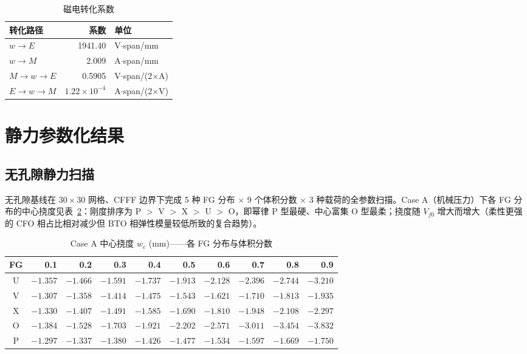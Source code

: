 \documentclass[11pt,a4paper]{ctexart}
\begin{document}
\begin{table}[H]
\centering
\caption{磁电转化系数}
\label{tab:coupling-coeff}
\begin{tabular}{lrl}
\toprule
\textbf{转化路径} & \textbf{系数} & \textbf{单位} \\
\midrule
$w \to E$ & 1941.40 & V$\cdot$span/mm \\
$w \to M$ & 2.009 & A$\cdot$span/mm \\
$M \to w \to E$ & 0.5905 & V$\cdot$span/(2$\times$A) \\
$E \to w \to M$ & $1.22\times10^{-4}$ & A$\cdot$span/(2$\times$V) \\
\bottomrule
\end{tabular}
\end{table}

\section{静力参数化结果}

\subsection{无孔隙静力扫描}

无孔隙基线在 $30\times30$ 网格、CFFF 边界下完成 5 种 FG 分布 $\times$ 9 个体积分数 $\times$ 3 种载荷的全参数扫描。Case A（机械压力）下各 FG 分布的中心挠度见表~\ref{tab:elastic-results}：刚度排序为 P $>$ V $>$ X $>$ U $>$ O，即幂律 P 型最硬、中心富集 O 型最柔；挠度随 $V_{f0}$ 增大而增大（柔性更强的 CFO 相占比相对减少但 BTO 相弹性模量较低所致的复合趋势）。

\begin{table}[H]
\centering
\caption{Case A 中心挠度 $w_c$ (mm)——各 FG 分布与体积分数}
\label{tab:elastic-results}
\small
\begin{tabular}{c*{9}{r}}
\toprule
\textbf{FG} & \textbf{0.1} & \textbf{0.2} & \textbf{0.3} & \textbf{0.4} & \textbf{0.5} & \textbf{0.6} & \textbf{0.7} & \textbf{0.8} & \textbf{0.9} \\
\midrule
U & $-1.357$ & $-1.466$ & $-1.591$ & $-1.737$ & $-1.913$ & $-2.128$ & $-2.396$ & $-2.744$ & $-3.210$ \\
V & $-1.307$ & $-1.358$ & $-1.414$ & $-1.475$ & $-1.543$ & $-1.621$ & $-1.710$ & $-1.813$ & $-1.935$ \\
X & $-1.330$ & $-1.407$ & $-1.491$ & $-1.585$ & $-1.690$ & $-1.810$ & $-1.948$ & $-2.108$ & $-2.297$ \\
O & $-1.384$ & $-1.528$ & $-1.703$ & $-1.921$ & $-2.202$ & $-2.571$ & $-3.011$ & $-3.454$ & $-3.832$ \\
P & $-1.297$ & $-1.337$ & $-1.380$ & $-1.426$ & $-1.477$ & $-1.534$ & $-1.597$ & $-1.669$ & $-1.750$ \\
\bottomrule
\end{tabular}
\end{table}
\end{document}
